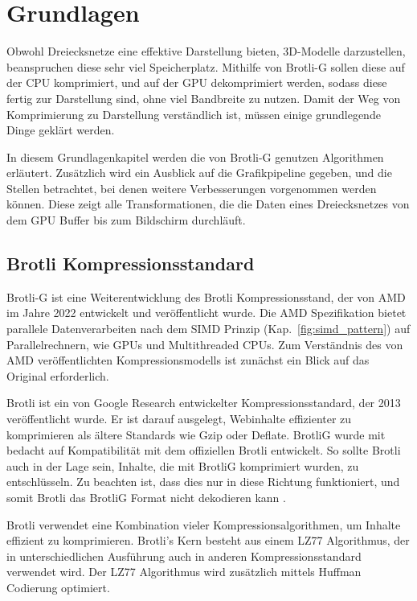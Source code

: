 \section{Grundlagen}

Obwohl Dreiecksnetze eine effektive Darstellung bieten, 3D-Modelle darzustellen, beanspruchen diese sehr viel Speicherplatz.
Mithilfe von Brotli-G sollen diese auf der CPU komprimiert, und auf der GPU dekomprimiert werden, sodass diese fertig zur Darstellung sind, ohne viel Bandbreite zu nutzen.
Damit der Weg von Komprimierung zu Darstellung verständlich ist, müssen einige grundlegende Dinge geklärt werden.

In diesem Grundlagenkapitel werden die von Brotli-G genutzen Algorithmen erläutert.
Zusätzlich wird ein Ausblick auf die Grafikpipeline gegeben, und die Stellen betrachtet, bei denen weitere Verbesserungen vorgenommen werden können.
Diese zeigt alle Transformationen, die die Daten eines Dreiecksnetzes von dem GPU Buffer bis zum Bildschirm durchläuft.

\subsection{Brotli Kompressionsstandard}
\label{subsec:brotli}
Brotli-G ist eine Weiterentwicklung des Brotli Kompressionsstand, der von AMD im Jahre 2022 entwickelt und veröffentlicht wurde.
Die AMD Spezifikation bietet parallele Datenverarbeiten nach dem SIMD Prinzip (Kap.~\ref{fig:simd_pattern}) auf Parallelrechnern, wie GPUs und Multithreaded CPUs.
Zum Verständnis des von AMD veröffentlichten Kompressionsmodells ist zunächst ein Blick auf das Original erforderlich. \newline

Brotli ist ein von Google Research entwickelter Kompressionsstandard, der 2013 veröffentlicht wurde.
Er ist darauf ausgelegt, Webinhalte effizienter zu komprimieren als ältere Standards wie Gzip oder Deflate.
BrotliG wurde mit bedacht auf Kompatibilität mit dem offiziellen Brotli entwickelt.
So sollte Brotli auch in der Lage sein, Inhalte, die mit BrotliG komprimiert wurden, zu entschlüsseln.
Zu beachten ist, dass dies nur in diese Richtung funktioniert, und somit Brotli das BrotliG Format nicht dekodieren kann  \cite{BrotliG2022}.

Brotli verwendet eine Kombination vieler Kompressionsalgorithmen, um Inhalte effizient zu komprimieren. 
Brotli's Kern besteht aus einem LZ77 Algorithmus, der in unterschiedlichen Ausführung auch in anderen Kompressionsstandard verwendet wird.
Der LZ77 Algorithmus wird zusätzlich mittels Huffman Codierung optimiert.

